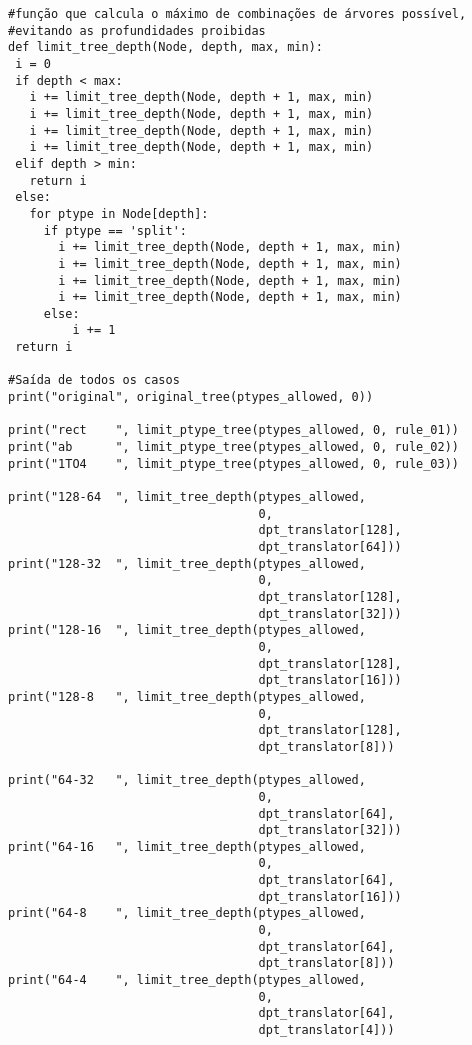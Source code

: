 \begin{verbatim}
#função que calcula o máximo de combinações de árvores possível, 
#evitando as profundidades proibidas
def limit_tree_depth(Node, depth, max, min):
 i = 0
 if depth < max:
   i += limit_tree_depth(Node, depth + 1, max, min)
   i += limit_tree_depth(Node, depth + 1, max, min)
   i += limit_tree_depth(Node, depth + 1, max, min)
   i += limit_tree_depth(Node, depth + 1, max, min)
 elif depth > min:
   return i
 else:
   for ptype in Node[depth]:
     if ptype == 'split':
       i += limit_tree_depth(Node, depth + 1, max, min)
       i += limit_tree_depth(Node, depth + 1, max, min)
       i += limit_tree_depth(Node, depth + 1, max, min)
       i += limit_tree_depth(Node, depth + 1, max, min)
     else:
         i += 1
 return i

#Saída de todos os casos
print("original", original_tree(ptypes_allowed, 0))
 
print("rect    ", limit_ptype_tree(ptypes_allowed, 0, rule_01))
print("ab      ", limit_ptype_tree(ptypes_allowed, 0, rule_02))
print("1TO4    ", limit_ptype_tree(ptypes_allowed, 0, rule_03))
 
print("128-64  ", limit_tree_depth(ptypes_allowed, 
                                   0,
                                   dpt_translator[128], 
                                   dpt_translator[64]))
print("128-32  ", limit_tree_depth(ptypes_allowed,
                                   0, 
                                   dpt_translator[128], 
                                   dpt_translator[32]))
print("128-16  ", limit_tree_depth(ptypes_allowed, 
                                   0, 
                                   dpt_translator[128], 
                                   dpt_translator[16]))
print("128-8   ", limit_tree_depth(ptypes_allowed, 
                                   0, 
                                   dpt_translator[128], 
                                   dpt_translator[8]))
 
print("64-32   ", limit_tree_depth(ptypes_allowed, 
                                   0,  
                                   dpt_translator[64], 
                                   dpt_translator[32]))
print("64-16   ", limit_tree_depth(ptypes_allowed, 
                                   0,  
                                   dpt_translator[64], 
                                   dpt_translator[16]))
print("64-8    ", limit_tree_depth(ptypes_allowed, 
                                   0,  
                                   dpt_translator[64], 
                                   dpt_translator[8]))
print("64-4    ", limit_tree_depth(ptypes_allowed, 
                                   0,  
                                   dpt_translator[64], 
                                   dpt_translator[4]))
 

\end{verbatim}
